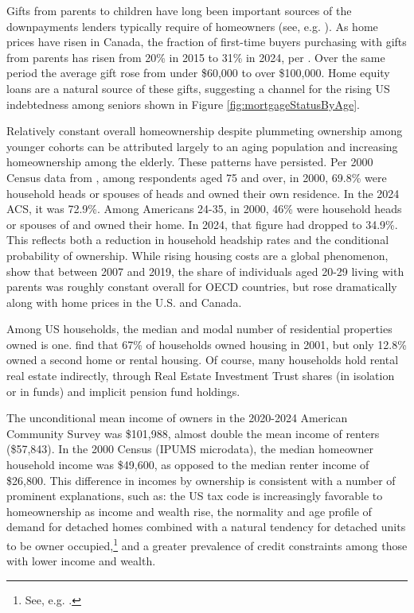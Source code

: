 \documentclass[12pt]{article}
\begin{document}
Gifts from parents to children have long been important sources of the
downpayments lenders typically require of homeowners (see, e.g.
\textcite{englehardtMayer}). As home prices have risen in Canada, the fraction
of first-time buyers purchasing with gifts from parents has risen from 20\% in
2015 to 31\% in 2024, per \textcite{Tal}. Over the same period the average gift
rose from under \$60,000 to over \$100,000. Home equity loans are a natural
source of these gifts, suggesting a channel for the rising US indebtedness
among seniors shown in Figure \ref{fig:mortgageStatusByAge}.

Relatively constant overall homeownership despite plummeting ownership among
younger cohorts can be attributed largely to an aging population and increasing
homeownership among the elderly. These patterns have persisted. Per 2000 Census
data from \textcite{IPUMS}, among respondents aged 75 and over, in 2000, 69.8\%
were household heads or spouses of heads and owned their own residence. In the
2024 ACS, it was 72.9\%. Among Americans 24-35, in 2000, 46\% were household
heads or spouses of and owned their home. In 2024, that figure had dropped to
34.9\%. This reflects both a reduction in household headship rates and the
conditional probability of ownership. While rising housing costs are a global
phenomenon, \textcite{OECDLaunch} show that between 2007 and 2019, the share
of individuals aged 20-29 living with parents was roughly constant overall for
OECD countries, but rose dramatically along with home prices in the U.S. and
Canada.

Among US households, the median and modal number of residential properties
owned is one. \textcite{AizcorbeKennickellMoore} find that 67\% of households
owned housing in 2001, but only 12.8\% owned a second home or rental housing.
Of course, many households hold rental real estate indirectly, through Real
Estate Investment Trust shares (in isolation or in funds) and implicit pension
fund holdings.

The unconditional mean income of owners in the 2020-2024 American Community
Survey was \$101,988, almost double the mean income of renters (\$57,843). In
the 2000 Census (IPUMS microdata), the median homeowner household income was
\$49,600, as opposed to the median renter income of \$26,800. This difference
in incomes by ownership is consistent with a number of prominent explanations,
such as: the US tax code is increasingly favorable to homeownership as income
and wealth rise, the normality and age profile of demand for detached homes
combined with a natural tendency for detached units to be owner
occupied,\footnote{See, e.g. \textcite{GlaeserShapiro}.} and a greater prevalence
of credit constraints among those with lower income and wealth. 
\end{document}

